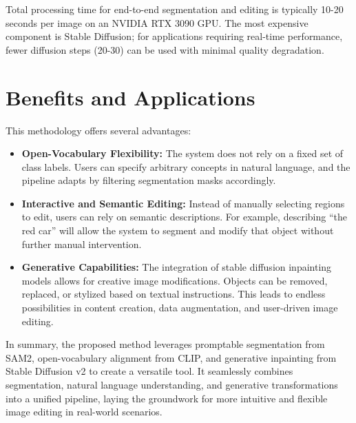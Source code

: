 Total processing time for end-to-end segmentation and editing is typically 10-20 seconds per image on an NVIDIA RTX 3090 GPU. The most expensive component is Stable Diffusion; for applications requiring real-time performance, fewer diffusion steps (20-30) can be used with minimal quality degradation.

\section{Benefits and Applications}
This methodology offers several advantages:
\begin{itemize}
    \item \textbf{Open-Vocabulary Flexibility:}  
    The system does not rely on a fixed set of class labels. Users can specify arbitrary concepts in natural language, and the pipeline adapts by filtering segmentation masks accordingly.

    \item \textbf{Interactive and Semantic Editing:}  
    Instead of manually selecting regions to edit, users can rely on semantic descriptions. For example, describing “the red car” will allow the system to segment and modify that object without further manual intervention.

    \item \textbf{Generative Capabilities:}  
    The integration of stable diffusion inpainting models allows for creative image modifications. Objects can be removed, replaced, or stylized based on textual instructions. This leads to endless possibilities in content creation, data augmentation, and user-driven image editing.
\end{itemize}

In summary, the proposed method leverages promptable segmentation from SAM2, open-vocabulary alignment from CLIP, and generative inpainting from Stable Diffusion v2 to create a versatile tool. It seamlessly combines segmentation, natural language understanding, and generative transformations into a unified pipeline, laying the groundwork for more intuitive and flexible image editing in real-world scenarios.
